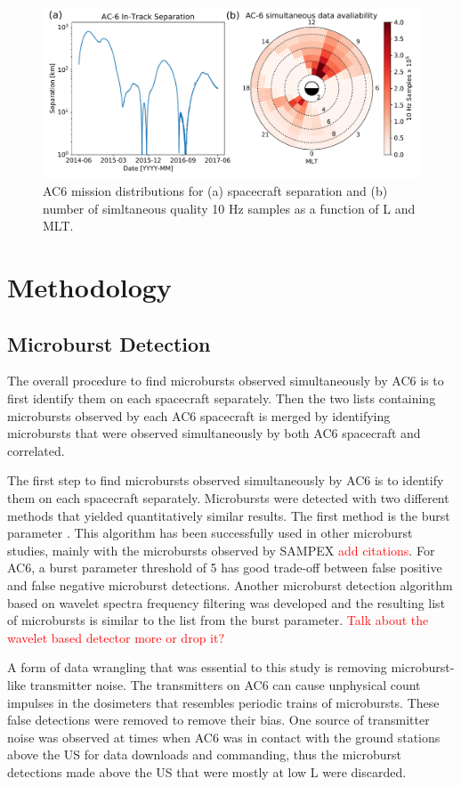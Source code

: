 \documentclass[draft]{agujournal2019}
\begin{document}
\begin{figure}
\includegraphics[width=\textwidth]{fig1.pdf}
\caption{AC6 mission distributions for (a) spacecraft separation and (b) number of simltaneous quality 10 Hz samples as a function of L and MLT.} \label{fig1}
\end{figure}

\section{Methodology}
\subsection{Microburst Detection}
The overall procedure to find microbursts observed simultaneously by AC6 is to first identify them on each spacecraft separately. Then the two lists containing microbursts observed by each AC6 spacecraft is merged by identifying microbursts that were observed simultaneously by both AC6 spacecraft and correlated.

The first step to find microbursts observed simultaneously by AC6 is to identify them on each spacecraft separately. Microbursts were detected with two different methods that yielded quantitatively similar results. The first method is the burst parameter \cite{O'Brien2003}. This algorithm has been successfully used in other microburst studies, mainly with the microbursts observed by SAMPEX \textcolor{red}{add citations}. For AC6, a burst parameter threshold of 5 has good trade-off between false positive and false negative microburst detections. Another microburst detection algorithm based on wavelet spectra frequency filtering was developed and the resulting list of microbursts is similar to the list from the burst parameter. \textcolor{red}{Talk about the wavelet based detector more or drop it?}

A form of data wrangling that was essential to this study is removing microburst-like transmitter noise. The transmitters on AC6 can cause unphysical count impulses in the dosimeters that resembles periodic trains of microbursts. These false detections were removed to remove their bias. One source of transmitter noise was observed at times when AC6 was in contact with the ground stations above the US for data downloads and commanding, thus the microburst detections made above the US that were mostly at low L were discarded. 
\end{document}
